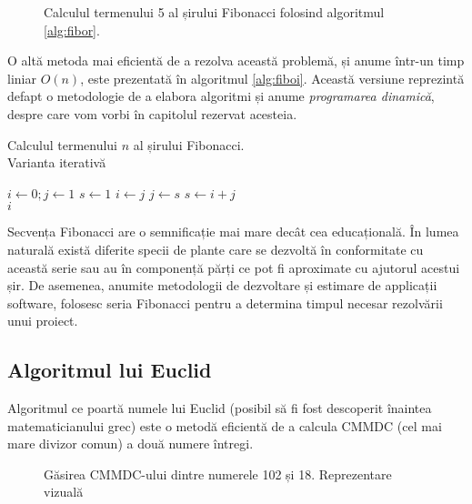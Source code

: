 \begin{figure}[H] 
	\centering	
	{
	}
	\caption{Calculul termenului 5 al șirului Fibonacci folosind algoritmul \ref{alg:fibor}.} 
	\label{fig:fibor}
\end{figure}

O altă metoda mai eficientă de a rezolva această problemă, și anume într-un timp liniar $O(n)$, este prezentată în algoritmul \ref{alg:fiboi}. Această versiune reprezintă defapt o metodologie de a elabora algoritmi și anume \textit{programarea dinamică}, despre care vom vorbi în capitolul rezervat acesteia.


\begin{algorithm}[H]
	\caption{Calculul termenului $n$ al șirului Fibonacci.\\ Varianta iterativă}\label{alg:fiboi}
	\begin{algorithmic}[1]
		\State $i \gets 0; j \gets 1$
		\State $s \gets 1$
		\State $i \gets j$
		\State $j \gets s$
		\State $s \gets i+j$
		\EndFor \\
		\Return $i$
		\EndProcedure
	\end{algorithmic}
\end{algorithm}

Secvența Fibonacci are o semnificație mai mare decât cea educațională. În lumea naturală există diferite specii de plante care se dezvoltă în conformitate cu această serie sau au în componență părți ce pot fi aproximate cu ajutorul acestui șir. De asemenea, anumite metodologii de dezvoltare și estimare de applicații software, folosesc seria Fibonacci pentru a determina timpul necesar rezolvării unui proiect.

\subsection{Algoritmul lui Euclid}

Algoritmul ce poartă numele lui Euclid (posibil să fi fost descoperit înaintea matematicianului grec) este o metodă eficientă de a calcula CMMDC (cel mai mare divizor comun) a două numere întregi.

\begin{figure}[H] 
	\centering	
	{
	}
	\caption{Găsirea CMMDC-ului dintre numerele 102 și 18. Reprezentare vizuală} 
	\label{fig:euclid}
\end{figure}

